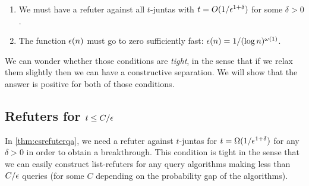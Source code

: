 \begin{enumerate}
    \item We must have a refuter against all $t$-juntas with $t = O(1 / \epsilon^{1+\delta})$ for
    some $\delta > 0$.
    \item The function $\epsilon(n)$ must go to zero sufficiently fast: $\epsilon(n) = 1/(\log n)^{\omega(1)}$.
\end{enumerate}

We can wonder whether those conditions are \emph{tight}, in the sense that if we relax them slightly 
then we can have a constructive separation. We will show that the answer is positive for both of
those conditions. 

\subsection{Refuters for $t \leq C/\epsilon$}

In \cref{thm:csrefuterqa}, we need a refuter against $t$-juntas for $t = \Omega(1/\epsilon^{1+\delta})$ for any $\delta > 0$ in order 
to obtain a breakthrough. This condition is tight in the sense that we can easily construct list-refuters
for any query algorithms making less than
$C/\epsilon$ queries (for some $C$ depending on the probability gap of the algorithms).

